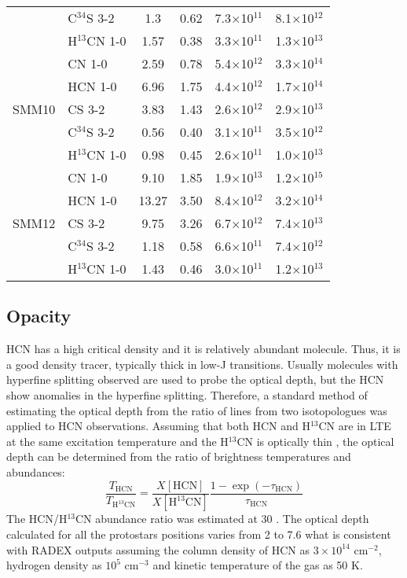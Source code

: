 \documentclass{aa}
\begin{document}
\begin{table*}
\begin{tabular}{l l c c c c}
{} & C$^{34}$S 3-2 & 1.3 & 0.62 & 7.3$\times$10$^{11}$ & 8.1$\times$10$^{12}$ \\ 
{} & H$^{13}$CN 1-0 & 1.57 & 0.38 & 3.3$\times$10$^{11}$ & 1.3$\times$10$^{13}$ \\ 
\hline
\multirow{5}{*}{SMM10} & CN 1-0 & 2.59 & 0.78 & 5.4$\times$10$^{12}$ & 3.3$\times$10$^{14}$\\
{} & HCN 1-0 & 6.96 & 1.75 & 4.4$\times$10$^{12}$ & 1.7$\times$10$^{14}$\\ 
{} & CS 3-2 & 3.83 & 1.43 & 2.6$\times$10$^{12}$ & 2.9$\times$10$^{13}$ \\  
{} & C$^{34}$S 3-2 & 0.56 & 0.40 & 3.1$\times$10$^{11}$ & 3.5$\times$10$^{12}$ \\ 
{} & H$^{13}$CN 1-0 & 0.98 & 0.45 & 2.6$\times$10$^{11}$ & 1.0$\times$10$^{13}$\\ 
\hline
\multirow{5}{*}{SMM12} & CN 1-0 & 9.10 & 1.85 & 1.9$\times$10$^{13}$ & 1.2$\times$10$^{15}$\\
{} & HCN 1-0 & 13.27 & 3.50 & 8.4$\times$10$^{12}$ & 3.2$\times$10$^{14}$\\ 
{} & CS 3-2 & 9.75 & 3.26 & 6.7$\times$10$^{12}$ & 7.4$\times$10$^{13}$\\  
{} & C$^{34}$S 3-2 & 1.18 & 0.58 & 6.6$\times$10$^{11}$ & 7.4$\times$10$^{12}$\\ 
{} & H$^{13}$CN 1-0 & 1.43 & 0.46 & 3.0$\times$10$^{11}$ & 1.2$\times$10$^{13}$\\ 
\hline
\end{tabular}
\end{table*}


\subsection{Opacity}


HCN has a high critical density and it is relatively abundant molecule. Thus, it is a good density tracer, typically thick in low-J transitions. Usually molecules with hyperfine splitting observed are used to probe the optical depth, but the HCN show anomalies in the hyperfine splitting. Therefore, a standard method of estimating the optical depth from the ratio of lines from two isotopologues \citep{Gol84} was applied to HCN observations. Assuming that both HCN and H$^{13}$CN are in LTE at the same excitation temperature and the H$^{13}$CN is optically thin \citep{Hog99}, the optical depth can be determined from the ratio of brightness temperatures and abundances:
\begin{equation} \label{eq1}
\frac{T_{\mathrm{HCN}}}{T_{\mathrm{H^{13}CN}}} = \frac{X[\mathrm{HCN}]}{X[\mathrm{H^{13}CN}]} \frac {1-\exp(-\tau_{\mathrm{HCN}})}{\tau_{\mathrm{HCN}}}
\end{equation}
The HCN/H$^{13}$CN abundance ratio was estimated at 30 \citep{Dan13}.
The optical depth calculated for all the protostars positions varies from 2 to 7.6 what is consistent with RADEX outputs assuming the column density of HCN as $3 \times 10^{14}$ cm$^{-2}$, hydrogen density as $10^5$ cm$^{-3}$ and kinetic temperature of the gas as 50 K. 
\end{document}
